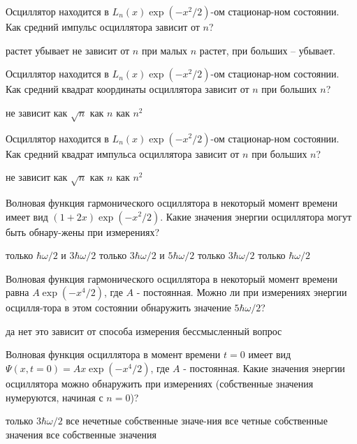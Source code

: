\documentclass[11pt,a4paper]{exam}
\begin{document}
\begin{questions}
\question Осциллятор находится в ${{L}_{n}}(x)\exp \left( -{{x}^{2}}/2 \right)$-ом стационар-ном состоянии. Как средний импульс осциллятора зависит от $n$?
\begin{choices}
\choice растет         
\choice убывает
\choice не зависит от $n$    
\choice при малых $n$ растет, при больших – убывает.
\end{choices}

\question Осциллятор находится в ${{L}_{n}}(x)\exp \left( -{{x}^{2}}/2 \right)$-ом стационар-ном состоянии. Как средний квадрат координаты осциллятора зависит от $n$ при больших $n$?
\begin{choices}
\choice не зависит     
\choice как $\sqrt{n}$    
\choice как $n$  
\choice как ${{n}^{2}}$
\end{choices}

\question Осциллятор находится в ${{L}_{n}}(x)\exp \left( -{{x}^{2}}/2 \right)$-ом стационар-ном состоянии. Как средний квадрат импульса осциллятора зависит от $n$ при больших $n$?
\begin{choices}
\choice не зависит     
\choice как $\sqrt{n}$    
\choice как $n$  
\choice как ${{n}^{2}}$
\end{choices}

\question Волновая функция гармонического осциллятора в некоторый момент времени имеет вид $(1+2x)\exp (-{{x}^{2}}/2)$. Какие значения энергии осциллятора могут быть обнару-жены при измерениях?
\begin{choices}
\choice только $\hbar \omega /2$ и $3\hbar \omega /2$         
\choice только $3\hbar \omega /2$ и $5\hbar \omega /2$
\choice только $3\hbar \omega /2$           
\choice только $\hbar \omega /2$
\end{choices}

\question Волновая функция гармонического осциллятора в некоторый момент времени равна $A\exp (-{{x}^{4}}/2)$, где $A$ - постоянная. Можно ли при измерениях энергии осцилля-тора в этом состоянии обнаружить значение $5\hbar \omega /2$?
\begin{choices}
\choice да                   
\choice нет
\choice это зависит от способа измерения    
\choice бессмысленный вопрос
\end{choices}

\question Волновая функция осциллятора в момент времени $t=0$ имеет вид $\Psi (x,t=0)=Ax\exp (-{{x}^{4}}/2)$, где $A$ - постоянная. Какие значения энергии осциллятора можно обнаружить при измерениях (собственные значения нумеруются, начиная с $n=0$)?
\begin{choices}
\choice только $3\hbar \omega /2$           
\choice все нечетные собственные значе-ния
\choice все четные собственные значения  
\choice все собственные значения
\end{choices}


\end{questions}
\end{document}

